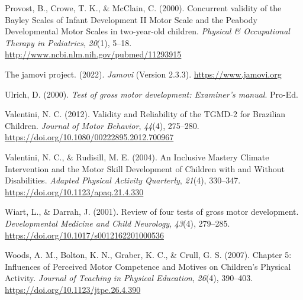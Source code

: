 \documentclass[
  man,
  colorlinks=true,linkcolor=blue,citecolor=blue,urlcolor=blue]{apa7}
\newlength{\cslhangindent}
\newlength{\cslentryspacingunit} %
\newenvironment{CSLReferences}[2] %
 {%
  \setlength{\parindent}{0pt}
  \ifodd #1
  \let\oldpar\par
  \def\par{\hangindent=\cslhangindent\oldpar}
  \fi
  \setlength{\parskip}{#2\cslentryspacingunit}
 }%
 {}
\begin{document}
\begin{CSLReferences}{1}{0}
\leavevmode{}%
Provost, B., Crowe, T. K., \& McClain, C. (2000). Concurrent validity of
the {Bayley Scales} of {Infant Development II Motor Scale} and the
{Peabody Developmental Motor Scales} in two-year-old children.
\emph{Physical \& Occupational Therapy in Pediatrics}, \emph{20}(1),
5--18. \url{http://www.ncbi.nlm.nih.gov/pubmed/11293915}

\leavevmode{}%
The jamovi project. (2022). \emph{Jamovi} (Version 2.3.3).
\url{https://www.jamovi.org}

\leavevmode{}%
Ulrich, D. (2000). \emph{Test of gross motor development: {Examiner}'s
manual}. {Pro-Ed}.

\leavevmode{}%
Valentini, N. C. (2012). Validity and {Reliability} of the {TGMD-2} for
{Brazilian Children}. \emph{Journal of Motor Behavior}, \emph{44}(4),
275--280. \url{https://doi.org/10.1080/00222895.2012.700967}

\leavevmode{}%
Valentini, N. C., \& Rudisill, M. E. (2004). An {Inclusive Mastery
Climate Intervention} and the {Motor Skill Development} of {Children}
with and {Without Disabilities}. \emph{Adapted Physical Activity
Quarterly}, \emph{21}(4), 330--347.
\url{https://doi.org/10.1123/apaq.21.4.330}

\leavevmode{}%
Wiart, L., \& Darrah, J. (2001). Review of four tests of gross motor
development. \emph{Developmental Medicine and Child Neurology},
\emph{43}(4), 279--285. \url{https://doi.org/10.1017/s0012162201000536}

\leavevmode{}%
Woods, A. M., Bolton, K. N., Graber, K. C., \& Crull, G. S. (2007).
Chapter 5: {Influences} of {Perceived Motor Competence} and {Motives} on
{Children}'s {Physical Activity}. \emph{Journal of Teaching in Physical
Education}, \emph{26}(4), 390--403.
\url{https://doi.org/10.1123/jtpe.26.4.390}

\end{CSLReferences}
\end{document}
